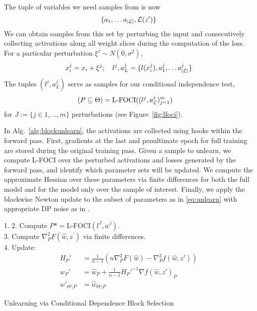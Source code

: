 The tuple of variables we need samples from is now
\begin{align}
    \{a_1, \ldots a_{|\mathcal{L}|}, \mathcal{L}(z^\prime)\}
\end{align}
We can obtain samples from this set by perturbing the input and consecutively collecting activations along all weight slices during the computation of the loss. For a particular perturbation $\xi^j \sim N(0,\sigma^2)$,
\begin{align}\label{eq:perturbsupp}
    x_i^j = x_i + \xi^j; \quad
    l^j, a_L^j = \{l(x_i^j), a_1^j, \ldots a_{|\mathcal{L}|}^j\}
\end{align}
The tuples $(l^j, a_L^j)$ serve as samples for our conditional independence test, 
\begin{align}
    (P \subseteq \Theta) &= \mbox{L-FOCI}((l^j, a_{\mathcal{L}}^j)_{j=1}^m)
\end{align}
for $J:=\{j \in 1,\ldots,m\}$ perturbations (see Figure~\ref{fig:lfoci}).

In Alg.~\ref{alg:blockunlearn}, the activations are collected using hooks within the forward pass. 
First, gradients at the last and penultimate epoch for full training are stored during the original training pass. Given a sample to unlearn, we compute L-FOCI over the perturbed activations and losses generated by the forward pass, and identify which parameter sets will be updated. We compute the approximate Hessian over these parameters via finite differences for both the full model and for the model only over the sample of interest. Finally, we apply the blockwise Newton update to the subset of parameters as in \eqref{eq:unlearn} with appropriate DP noise as in \cite{sekhari2021remember}.
\begin{algorithm}
\SetAlgoLined
{}
1. 
2. Compute $P* = \mbox{L-FOCI}(l^J, a^J)$. \\
3. Compute $\nabla^2_{P} F(\hat{w}, z^\prime)$ via finite differences. \\
4. Update:
\begin{align}
    H_P' &= \frac{1}{n-1}\left(n \nabla^2_{P} F(\hat{w}) - \nabla^2_{P} f(\hat{w}, z')\right) \\
    w_{P}' &= \hat{w}_{P} + \frac{1}{n-1}H_{P}'^{-1} \nabla f(\hat{w}, z')_{P} \\
    w'_{\Theta\setminus P} &= \hat{w}_{\Theta\setminus P}
\end{align}
 \caption{\label{alg:blockunlearn} Unlearning via Conditional Dependence Block Selection}
\end{algorithm}

